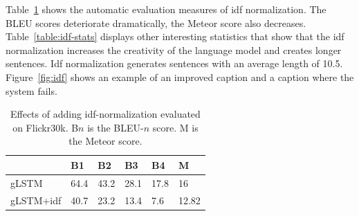 \documentclass[twoside,twocolumn]{article}
\begin{document}
	Table~\ref{table:results_idf} shows the automatic evaluation measures of idf normalization. The BLEU scores deteriorate dramatically, the Meteor score also decreases. Table~\ref{table:idf-stats} displays other interesting statistics that show that the idf normalization increases the creativity of the language model and creates longer sentences. Idf normalization generates sentences with an average length of 10.5. Figure~\ref{fig:idf} shows an example of an improved caption and a caption where the system fails.
	
	\begin{table}
		\centering
		\begin{tabular}{llllll}
			~                  & B1 & B2 & B3 & B4 & M \\ \hline
			gLSTM        & 64.4   & 43.2            & 28.1   & 17.8   & 16 \\
			gLSTM+idf   & 40.7   & 23.2   & 13.4   & 7.6 & 12.82 \\ \hline
			
		\end{tabular}
		
		\caption{Effects of adding idf-normalization evaluated on Flickr30k. B$n$ is the BLEU-$n$ score. M is the Meteor score.}
		\label{table:results_idf}
	\end{table}
	
\end{document}
